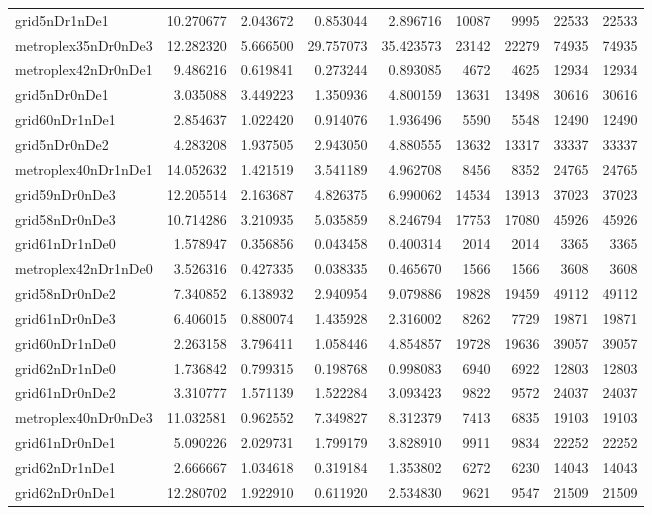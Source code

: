 \begin{longtable}{|l|r|r|r|r|r|r|r|r|}
grid5nDr1nDe1 & 10.270677 & 2.043672 & 0.853044 & 2.896716 & 10087 & 9995 & 22533 & 22533 \\
metroplex35nDr0nDe3 & 12.282320 & 5.666500 & 29.757073 & 35.423573 & 23142 & 22279 & 74935 & 74935 \\
metroplex42nDr0nDe1 & 9.486216 & 0.619841 & 0.273244 & 0.893085 & 4672 & 4625 & 12934 & 12934 \\
grid5nDr0nDe1 & 3.035088 & 3.449223 & 1.350936 & 4.800159 & 13631 & 13498 & 30616 & 30616 \\
grid60nDr1nDe1 & 2.854637 & 1.022420 & 0.914076 & 1.936496 & 5590 & 5548 & 12490 & 12490 \\
grid5nDr0nDe2 & 4.283208 & 1.937505 & 2.943050 & 4.880555 & 13632 & 13317 & 33337 & 33337 \\
metroplex40nDr1nDe1 & 14.052632 & 1.421519 & 3.541189 & 4.962708 & 8456 & 8352 & 24765 & 24765 \\
grid59nDr0nDe3 & 12.205514 & 2.163687 & 4.826375 & 6.990062 & 14534 & 13913 & 37023 & 37023 \\
grid58nDr0nDe3 & 10.714286 & 3.210935 & 5.035859 & 8.246794 & 17753 & 17080 & 45926 & 45926 \\
grid61nDr1nDe0 & 1.578947 & 0.356856 & 0.043458 & 0.400314 & 2014 & 2014 & 3365 & 3365 \\
metroplex42nDr1nDe0 & 3.526316 & 0.427335 & 0.038335 & 0.465670 & 1566 & 1566 & 3608 & 3608 \\
grid58nDr0nDe2 & 7.340852 & 6.138932 & 2.940954 & 9.079886 & 19828 & 19459 & 49112 & 49112 \\
grid61nDr0nDe3 & 6.406015 & 0.880074 & 1.435928 & 2.316002 & 8262 & 7729 & 19871 & 19871 \\
grid60nDr1nDe0 & 2.263158 & 3.796411 & 1.058446 & 4.854857 & 19728 & 19636 & 39057 & 39057 \\
grid62nDr1nDe0 & 1.736842 & 0.799315 & 0.198768 & 0.998083 & 6940 & 6922 & 12803 & 12803 \\
grid61nDr0nDe2 & 3.310777 & 1.571139 & 1.522284 & 3.093423 & 9822 & 9572 & 24037 & 24037 \\
metroplex40nDr0nDe3 & 11.032581 & 0.962552 & 7.349827 & 8.312379 & 7413 & 6835 & 19103 & 19103 \\
grid61nDr0nDe1 & 5.090226 & 2.029731 & 1.799179 & 3.828910 & 9911 & 9834 & 22252 & 22252 \\
grid62nDr1nDe1 & 2.666667 & 1.034618 & 0.319184 & 1.353802 & 6272 & 6230 & 14043 & 14043 \\
grid62nDr0nDe1 & 12.280702 & 1.922910 & 0.611920 & 2.534830 & 9621 & 9547 & 21509 & 21509 \\

\end{longtable}
